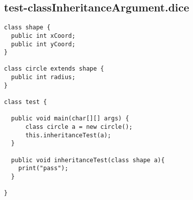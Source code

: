 \subsection{test-classInheritanceArgument.dice}
\begin{verbatim}
class shape {
  public int xCoord;
  public int yCoord;
}

class circle extends shape {
  public int radius;
}

class test {

  public void main(char[][] args) {
      class circle a = new circle(); 
      this.inheritanceTest(a);
  }

  public void inheritanceTest(class shape a){
    print("pass");
  }

}
\end{verbatim}